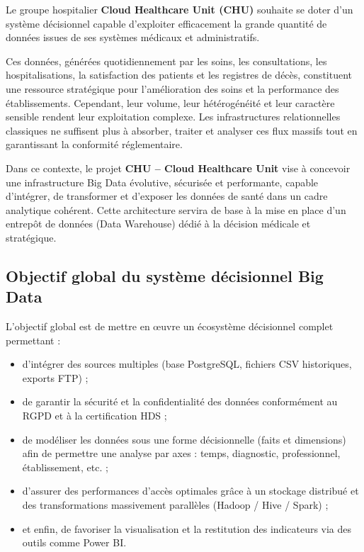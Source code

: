 \documentclass[12pt,a4paper]{article}
\begin{document}
Le groupe hospitalier \textbf{Cloud Healthcare Unit (CHU)} souhaite se doter d'un système décisionnel capable d'exploiter efficacement la grande quantité de données issues de ses systèmes médicaux et administratifs.

Ces données, générées quotidiennement par les soins, les consultations, les hospitalisations, la satisfaction des patients et les registres de décès, constituent une ressource stratégique pour l'amélioration des soins et la performance des établissements. Cependant, leur volume, leur hétérogénéité et leur caractère sensible rendent leur exploitation complexe. Les infrastructures relationnelles classiques ne suffisent plus à absorber, traiter et analyser ces flux massifs tout en garantissant la conformité réglementaire.

Dans ce contexte, le projet \textbf{CHU – Cloud Healthcare Unit} vise à concevoir une infrastructure Big Data évolutive, sécurisée et performante, capable d'intégrer, de transformer et d'exposer les données de santé dans un cadre analytique cohérent. Cette architecture servira de base à la mise en place d'un entrepôt de données (Data Warehouse) dédié à la décision médicale et stratégique.

\subsection{Objectif global du système décisionnel Big Data}

L'objectif global est de mettre en œuvre un écosystème décisionnel complet permettant :

\begin{itemize}[leftmargin=*]
    \item d'intégrer des sources multiples (base PostgreSQL, fichiers CSV historiques, exports FTP) ;
    \item de garantir la sécurité et la confidentialité des données conformément au RGPD et à la certification HDS ;
    \item de modéliser les données sous une forme décisionnelle (faits et dimensions) afin de permettre une analyse par axes : temps, diagnostic, professionnel, établissement, etc. ;
    \item d'assurer des performances d'accès optimales grâce à un stockage distribué et des transformations massivement parallèles (Hadoop / Hive / Spark) ;
    \item et enfin, de favoriser la visualisation et la restitution des indicateurs via des outils comme Power BI.
\end{itemize}
\end{document}
